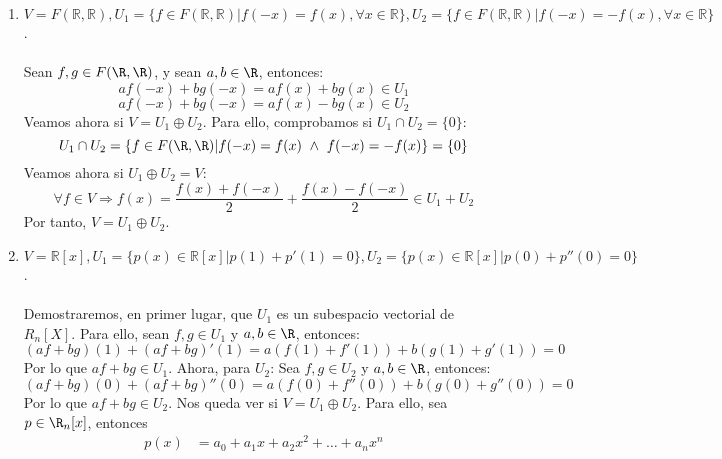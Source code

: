 \begin{ejercicio}
\begin{enumerate}
		\item \( V = F(\mathbb{R},\mathbb{R}), U_1 = \{f \in F(\mathbb{R},\mathbb{R}) | f(-x) = f(x), \forall x \in \mathbb{R}\}, U_2 = \{f \in F(\mathbb{R},\mathbb{R}) | f(-x) = -f(x), \forall x \in \mathbb{R}\} \).
		      \\ \\
		      Sean $f,g \in F(\R,\R)$, y sean $a,b \in \R$, entonces:
		      \begin{equation*}
			      a f(-x) + b g(-x) = a f(x) + b g(x) \in U_1
		      \end{equation*}
		      \begin{equation*}
			      a f(-x) + b g(-x) = a f(x) - b g(x) \in U_2
		      \end{equation*}
		      Veamos ahora si $V = U_1 \oplus U_2$. Para ello, comprobamos si $ U_1 \cap U_2 = \{0\} $:
		      \begin{equation*}
			      U_1 \cap U_2 = \{f \in F(\R,\R) | f(-x) = f(x) \ \land \ f(-x) = -f(x)\} = \{0\}
		      \end{equation*}
		      Veamos ahora si $U_1 \oplus U_2 = V$:
		      \begin{equation*}
			      \forall f \in V \Rightarrow f(x) = \frac{f(x) + f(-x)}{2} + \frac{f(x) - f(-x)}{2} \in U_1 + U_2
		      \end{equation*}
		      Por tanto, \( V = U_1 \oplus U_2 \).
		\item \( V = \mathbb{R}[x], U_1 = \{p(x) \in \mathbb{R}[x] | p(1) + p'(1) = 0\}, U_2 = \{p(x) \in \mathbb{R}[x] | p(0) + p''(0) = 0\} \).
		      \\ \\ Demostraremos, en primer lugar, que $U_1$ es un subespacio vectorial de $R_n[X]$. Para ello,
		      sean $f, g \in U_1$ y $a,b \in \R$, entonces:
		      \begin{equation*}
			      (af +bg)(1) + (af + bg)'(1) = a(f(1) + f'(1)) + b(g(1) + g'(1)) = 0
		      \end{equation*}
		      Por lo que $af + bg \in U_1$. Ahora, para $U_2$:
		      Sea $f,g \in U_2$ y $a,b \in \R$, entonces:
		      \begin{equation*}
			      (af + bg)(0) + (af + bg)''(0) = a(f(0) + f''(0)) + b(g(0) + g''(0)) = 0
		      \end{equation*}
		      Por lo que $af + bg \in U_2$.
		      Nos queda ver si $V = U_1 \oplus U_2$. Para ello, sea $p \in \R_n[x]$, entonces
		      \begin{align*}
			      p(x)   & = a_0 + a_1 x + a_2 x^2 + \ldots + a_n x^n            \\

\end{align*}
\end{enumerate}
\end{ejercicio}
